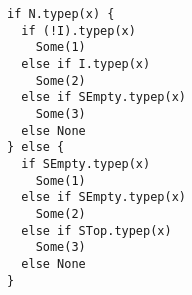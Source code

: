 \begin{lstlisting}[style=reclojureScala]
if N.typep(x) {
  if (!I).typep(x)
    Some(1)
  else if I.typep(x)
    Some(2)
  else if SEmpty.typep(x)
    Some(3)
  else None
} else {
  if SEmpty.typep(x)
    Some(1)
  else if SEmpty.typep(x)
    Some(2)
  else if STop.typep(x)
    Some(3)
  else None
}
\end{lstlisting}
